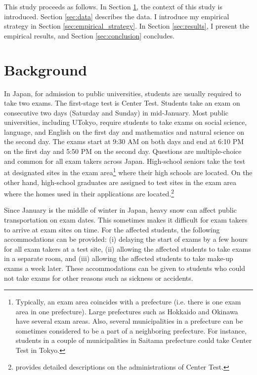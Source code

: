 \documentclass[12pt,letterpaper]{article}
\begin{document}
This study proceeds as follows.
In Section \ref{sec:background}, the context of this study is introduced.
Section \ref{sec:data} describes the data. 
I introduce my empirical strategy in Section \ref{sec:empirical_strategy}.
In Section \ref{sec:results}, I present the empirical results, and Section \ref{sec:conclusion} concludes.
  
\section{Background}\label{sec:background}

In Japan, for admission to public universities, students are usually required to take two exams.
The first-stage test is Center Test.
Students take an exam on consecutive two days (Saturday and Sunday) in mid-January.
Most public universities, including UTokyo, require students to take exams on social science, language, and English on the first day and mathematics and natural science on the second day.
The exams start at 9:30 AM on both days and end at 6:10 PM on the first day and 5:50 PM on the second day.
Questions are multiple-choice and common for all exam takers across Japan.
High-school seniors take the test at designated sites in the exam area\footnote{ \label{footnote:prefecture}
  Typically, an exam area coincides with a prefecture (i.e. there is one exam area in one prefecture).
  Large prefectures such as Hokkaido and Okinawa have several exam areas.
  Also, several municipalities in a prefecture can be sometimes considered to be a part of a neighboring prefecture.
  For instance, students in a couple of municipalities in Saitama prefecture could take Center Test in Tokyo.
} where their high schools are located.
On the other hand, high-school graduates are assigned to test sites in the exam area where the homes used in their applications are located.\footnote{
  \citet{Watanabe2013} provides detailed descriptions on the administrations of Center Test.
}

Since January is the middle of winter in Japan, heavy snow can affect public transportation on exam dates.
This sometimes makes it difficult for exam takers to arrive at exam sites on time.
For the affected students, the following accommodations can be provided:
(i) delaying the start of exams by a few hours for all exam takers at a test site,
(ii) allowing the affected students to take exams in a separate room, and
(iii) allowing the affected students to take make-up exams a week later.
These accommodations can be given to students who could not take exams for other reasons such as sickness or accidents.
\end{document}
